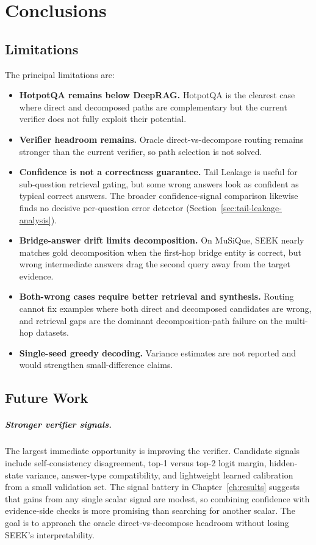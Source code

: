 
\chapter{Conclusions}
\label{ch:conclusion}

\section{Limitations}

The principal limitations are:

\begin{itemize}
    \item \textbf{HotpotQA remains below DeepRAG.} HotpotQA is the clearest case where direct and decomposed paths are complementary but the current verifier does not fully exploit their potential.
    \item \textbf{Verifier headroom remains.} Oracle direct-vs-decompose routing remains stronger than the current verifier, so path selection is not solved.
    \item \textbf{Confidence is not a correctness guarantee.} Tail Leakage is useful for sub-question retrieval gating, but some wrong answers look as confident as typical correct answers. The broader confidence-signal comparison likewise finds no decisive per-question error detector (Section~\ref{sec:tail-leakage-analysis}).
    \item \textbf{Bridge-answer drift limits decomposition.} On MuSiQue, SEEK nearly matches gold decomposition when the first-hop bridge entity is correct, but wrong intermediate answers drag the second query away from the target evidence.
    \item \textbf{Both-wrong cases require better retrieval and synthesis.} Routing cannot fix examples where both direct and decomposed candidates are wrong, and retrieval gaps are the dominant decomposition-path failure on the multi-hop datasets.
    \item \textbf{Single-seed greedy decoding.} Variance estimates are not reported and would strengthen small-difference claims.
\end{itemize}

\section{Future Work}

\paragraph{Stronger verifier signals.} The largest immediate opportunity is improving the verifier. Candidate signals include self-consistency disagreement, top-1 versus top-2 logit margin, hidden-state variance, answer-type compatibility, and lightweight learned calibration from a small validation set. The signal battery in Chapter~\ref{ch:results} suggests that gains from any single scalar signal are modest, so combining confidence with evidence-side checks is more promising than searching for another scalar. The goal is to approach the oracle direct-vs-decompose headroom without losing SEEK's interpretability.

